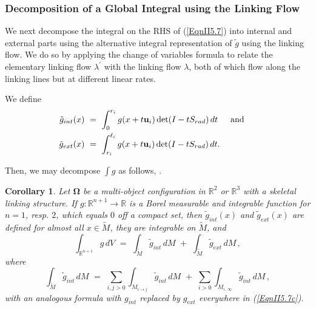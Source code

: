 \documentclass[10pt]{amsart}
\newtheorem{Corollary}[Thm]{Corollary}
\theoremstyle{definition}
\theoremstyle{definition}
\numberwithin{equation}{section}
\newcommand{\R}{{\mathbb R}}
\def \bu {\mathbf {u}}
\def \bgW {\boldsymbol \Omega}
\def \gl {\lambda}
\begin{document}
\subsubsection*{Decomposition of a Global Integral using the Linking 
Flow} 
\par  
We next decompose the integral on the RHS of (\ref{EqnII5.7}) into internal 
and external parts using the alternative integral representation of $\tilde 
g$ using the linking flow.  
We do so by applying the change of variables formula to relate the 
elementary linking flow $\gl^{\prime}$ with the linking flow $\gl$, both 
of which flow along the linking lines but at different linear rates.  \par
We define 
\begin{align}
\label{EqnII5.14}
  \tilde g_{int}(x) \,\, &= \,\, \int_{0}^{r_i } g(x + t\bu_i) 
\det(I - t S_{rad})\, dt\, \quad \text{ and } \quad \notag \\
\tilde g_{ext}(x) \,\, &= \,\, \int_{r_i }^{\ell_i} g(x + t\bu_i) \det(I - t 
S_{rad})\, dt. 
\end{align}
\par
\begin{comment}
These may be alternately written using a change of coordinates as
\begin{equation}
\label{EqnII5.15a}
  \tilde g_{int}(x) \,\, = \,\, r_i \int_{0}^{1} g(x + t r_i\bu_i) 
\det(I - t r_i S_{rad})\, dt\, . 
\end{equation}
and 
\begin{equation}
\label{EqnII5.15b}
  \tilde g_{ext}(x) \,\, = \,\, (\ell_i - r_i) \int_{0}^{1} g(x + (r_i + t(\ell_i 
- r_i))\bu_i) \det(I - (r_i +t (\ell_i - r_i)) S_{rad})\, dt\, . 
\end{equation}
\end{comment}
Then, we may decompose $\int g$ as follows, \cite[Cor. 10.10]{DG}.
\begin{Corollary}
\label{CorII5.6}
Let $\bgW$ be a multi-object configuration in $\R^2$ or $\R^3$ with a 
skeletal 
linking structure.  If $g : \R^{n+1} \to \R$ is a Borel 
measurable and integrable function for $n = 1$, resp. $2$, which equals 
$0$ off a compact set, then $\tilde 
g_{int}(x)$ and $\tilde g_{ext}(x)$ are defined for almost all $x \in \tilde 
M$, they are integrable on $\tilde M$, and 
\begin{equation}
\label{EqnII5.7b}
\int_{\R^{n+1}} g\, dV \,\, = \,\, \int_{\tilde M} \tilde g_{int} \, dM\, \, + 
\,\, \int_{\tilde M} \tilde g_{ext} \, dM \, ,
\end{equation} 
where 
\begin{equation}
\label{EqnII5.7c}
\int_{\tilde M} \tilde g_{int} \, dM \,\, = \,\, \sum_{i, j >0} \int_{ M_{i \to 
j}} \tilde g_{int} \, dM\, \, + \,\, \sum_{i >0} \int_{M_{i \, ,\infty}} \tilde 
g_{int} \, dM \, ,
\end{equation} 
with an analogous formula with $g_{int}$ replaced by $g_{ext}$ 
everywhere in (\ref{EqnII5.7c}).  
\end{Corollary}
\end{document}
